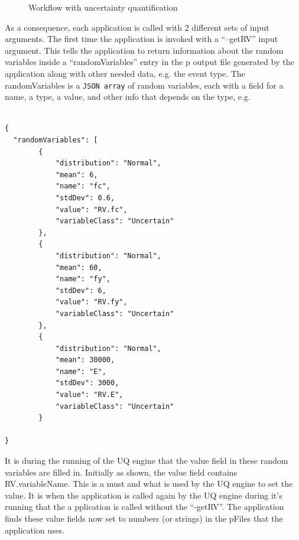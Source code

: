 \begin{figure}[!htbp]
  \caption{Workflow with uncertainty quantification}
  \label{fig:figure18}
\end{figure}

As a consequence, each application is called with 2 different sets of
input arguments. The first time the application is invoked with a
“–getRV” input argument. This tells the application to return
information about the random variables inside a “randomVariables”
entry in the p output file generated by the application along with
other needed data, e.g. the event type. The randomVariables is a
\texttt{JSON array} of random variables, each with a field for a name,
a type, a value, and other info that depends on the type, e.g. \\ \\


\begin{lstlisting}
{
  "randomVariables": [
        {
            "distribution": "Normal",
            "mean": 6,
            "name": "fc",
            "stdDev": 0.6,
            "value": "RV.fc",
            "variableClass": "Uncertain"
        },
        {
            "distribution": "Normal",
            "mean": 60,
            "name": "fy",
            "stdDev": 6,
            "value": "RV.fy",
            "variableClass": "Uncertain"
        },
        {
            "distribution": "Normal",
            "mean": 30000,
            "name": "E",
            "stdDev": 3000,
            "value": "RV.E",
            "variableClass": "Uncertain"
        }

}
\end{lstlisting}

It is during the running of the UQ engine that the value field in
these random variables are filled in. Initially as shown, the value
field contains RV.variableName.  This is a must and what is used by
the UQ engine to set the value. It is when the application is called
again by the UQ engine during it’s running that the a pplication is
called without the “-getRV”. The application finds these value fields
now set to numbers (or strings) in the pFiles that the application
uses. \\

